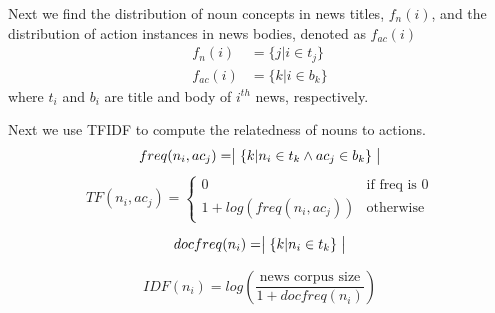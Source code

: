 Next we find the distribution of noun concepts in news titles, $f_n(i)$, and the distribution of action instances in news bodies, denoted as $f_{ac}(i)$ 
\begin{align*}
    f_n(i) & = \{ j |  i \in t_j \} \\
    f_{ac}(i) &= \{ k | i \in b_k \}
\end{align*}
where $t_i$ and $b_i$ are title and body of $i^{th}$ news, respectively. 

Next we use TFIDF to compute the relatedness of nouns to actions. 
\begin{equation*}
    freq(n_i, ac_j) = \bigm| \{ k | n_i \in t_k \land ac_j \in b_k \} \bigm|
\end{equation*}
\begin{equation*}
    TF(n_i, ac_j) = \begin{cases} 0 &\mbox{if freq is 0} \\
        1 + log(freq(n_i, ac_j)) &\mbox{otherwise}
    \end{cases}
\end{equation*}


\begin{equation*}
    docfreq(n_i) = \bigm| \{ k | n_i \in t_k \} \bigm|
\end{equation*}


\begin{equation*}
    IDF(n_i) = log(\frac{\text{news corpus size}}{1 + docfreq(n_i)})
\end{equation*}
